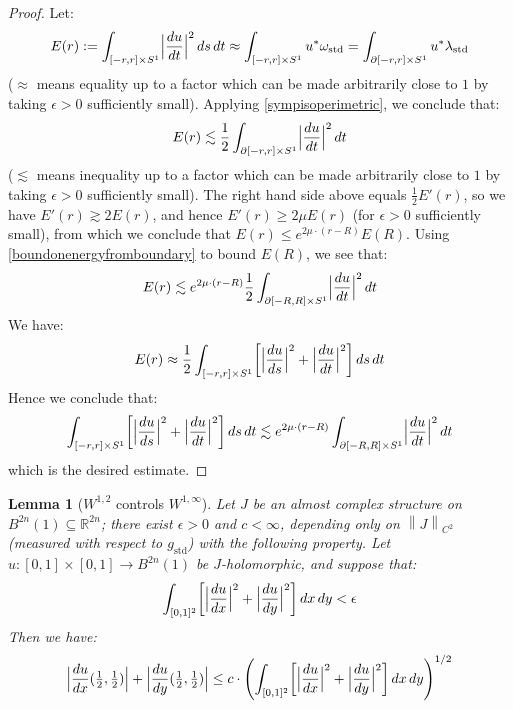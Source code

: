 \documentclass[12pt]{article}
\newtheorem{lemma}[theorem]{Lemma}
\theoremstyle{definition}
\theoremstyle{remark}
\numberwithin{equation}{subsection}
\newcommand{\RR}{\mathbb R}
\newcommand{\std}{\mathrm{std}}
\begin{document}
\begin{proof}
Let:
\begin{equation}
E(r):=\int_{[-r,r]\times S^1}\Bigl|\frac{du}{dt}\Bigr|^2\,ds\,dt\approx\int_{[-r,r]\times S^1}u^\ast\omega_\std=\int_{\partial[-r,r]\times S^1}u^\ast\lambda_\std
\end{equation}
($\approx$ means equality up to a factor which can be made arbitrarily close to $1$ by taking $\epsilon>0$ sufficiently small).  Applying \eqref{sympisoperimetric}, we conclude that:
\begin{equation}\label{boundonenergyfromboundary}
E(r)\lesssim\frac 12\int_{\partial[-r,r]\times S^1}\Bigl|\frac{du}{dt}\Bigr|^2\,dt
\end{equation}
($\lesssim$ means inequality up to a factor which can be made arbitrarily close to $1$ by taking $\epsilon>0$ sufficiently small).  The right hand side above equals $\frac 12E'(r)$, so we have $E'(r)\gtrsim 2E(r)$, and hence $E'(r)\geq 2\mu E(r)$ (for $\epsilon>0$ sufficiently small), from which we conclude that $E(r)\leq e^{2\mu\cdot(r-R)}E(R)$.  Using \eqref{boundonenergyfromboundary} to bound $E(R)$, we see that:
\begin{equation}
E(r)\lesssim e^{2\mu\cdot(r-R)}\frac 12\int_{\partial[-R,R]\times S^1}\Bigl|\frac{du}{dt}\Bigr|^2\,dt
\end{equation}
We have:
\begin{equation}
E(r)\approx\frac 12\int_{[-r,r]\times S^1}\biggl[\Bigl|\frac{du}{ds}\Bigr|^2+\Bigl|\frac{du}{dt}\Bigr|^2\biggr]\,ds\,dt
\end{equation}
Hence we conclude that:
\begin{equation}
\int_{[-r,r]\times S^1}\biggl[\Bigl|\frac{du}{ds}\Bigr|^2+\Bigl|\frac{du}{dt}\Bigr|^2\biggr]\,ds\,dt\lesssim e^{ 2\mu\cdot(r-R)}\int_{\partial[-R,R]\times S^1}\Bigl|\frac{du}{dt}\Bigr|^2\,dt
\end{equation}
which is the desired estimate.
\end{proof}

\begin{lemma}[$W^{1,2}$ controls $W^{1,\infty}$]\label{energycontrolsWoneinfty}
Let $J$ be an almost complex structure on $B^{2n}(1)\subseteq\RR^{2n}$; there exist $\epsilon>0$ and $c<\infty$, depending only on $\left\|J\right\|_{C^2}$ (measured with respect to $g_\std$) with the following property.  Let $u:[0,1]\times[0,1]\to B^{2n}(1)$ be $J$-holomorphic, and suppose that:
\begin{equation}
\int_{[0,1]^2}\biggl[\Bigl|\frac{du}{dx}\Bigr|^2+\Bigl|\frac{du}{dy}\Bigr|^2\biggr]\,dx\,dy<\epsilon
\end{equation}
Then we have:
\begin{equation}
\Bigl|\frac{du}{dx}({\textstyle\frac 12},{\textstyle\frac 12})\Bigr|+\Bigl|\frac{du}{dy}({\textstyle\frac 12},{\textstyle\frac 12})\Bigr|\leq c\cdot\left(\int_{[0,1]^2}\biggl[\Bigl|\frac{du}{dx}\Bigr|^2+\Bigl|\frac{du}{dy}\Bigr|^2\biggr]\,dx\,dy\right)^{1/2}
\end{equation}
\end{lemma}
\end{document}
